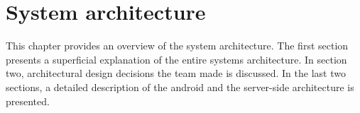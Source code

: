 \chapter{System architecture}
This chapter provides an overview of the system architecture. The first section presents a superficial explanation of the entire systems architecture. In section two, architectural design decisions the team made is discussed. In the last two sections, a detailed description of the android and the server-side architecture is presented. 





